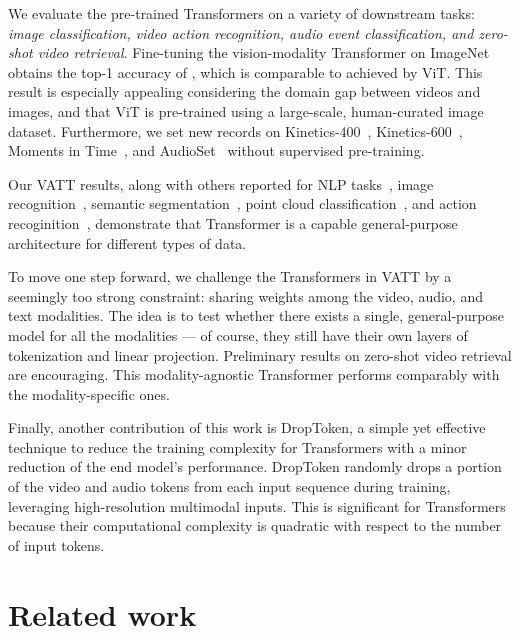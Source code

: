 \documentclass[10pt,twocolumn,letterpaper]{article}
\begin{document}
We evaluate the pre-trained Transformers on a variety of downstream tasks: \emph{image classification, video action recognition, audio event
classification, and zero-shot video retrieval}. Fine-tuning the vision-modality Transformer on ImageNet~\cite{deng2009imagenet} obtains the top-1 accuracy of , which is comparable to  achieved by ViT. This result is especially appealing considering the domain gap between videos and images, and that ViT is pre-trained using a large-scale, human-curated image dataset. Furthermore, we set new records on Kinetics-400~\cite{kinetics400}, Kinetics-600~\cite{kinetics600}, Moments in Time~\cite{monfort2019moments}, and AudioSet~\cite{audioset} without supervised pre-training.

Our VATT results, along with others reported for NLP tasks~\cite{devlin2018bert,brown2020language}, image recognition~\cite{dosovitskiy2021an}, semantic segmentation~\cite{zheng2020rethinking}, point cloud classification~\cite{zhao2020point}, and action recoginition~\cite{bertasius2021space}, demonstrate that Transformer is a capable general-purpose architecture for different types of data. 

To move one step forward, we challenge the Transformers in VATT by a seemingly too strong constraint: sharing weights among the video, audio, and text modalities. The idea is to test whether there exists a single, general-purpose model for all the modalities --- of course, they still have their own layers of tokenization and linear projection. Preliminary results on zero-shot video retrieval are encouraging. This modality-agnostic Transformer performs comparably with the modality-specific ones.

Finally, another contribution of this work is DropToken, a simple yet effective technique to reduce the training complexity for Transformers with a minor reduction of the end model's performance. DropToken randomly drops a portion of the video and audio tokens from each input sequence during training, leveraging high-resolution multimodal inputs. This is significant for Transformers because their computational complexity is quadratic with respect to the number of input tokens. 


\section{Related work}
\end{document}
